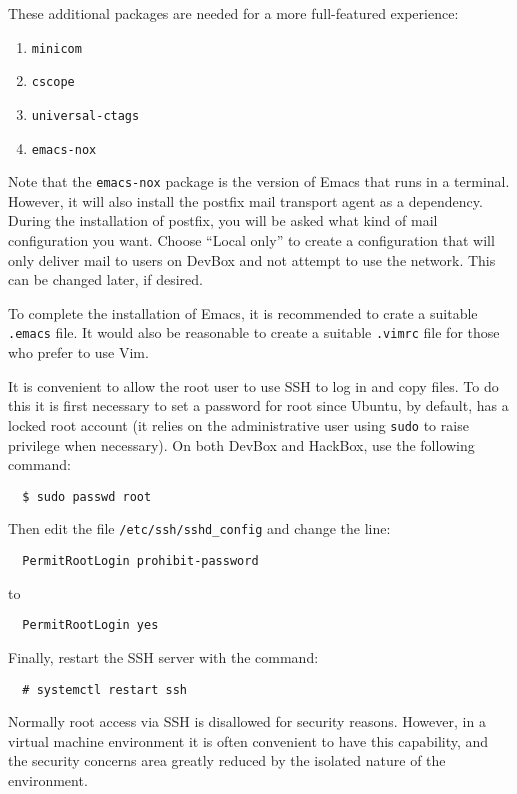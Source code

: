 \documentclass{article}
\newcommand{\command}[1]{\texttt{#1}}
\newcommand{\filename}[1]{\texttt{#1}}
\begin{document}
These additional packages are needed for a more full-featured experience:
\begin{enumerate}
  \item \texttt{minicom}
  \item \texttt{cscope}
  \item \texttt{universal-ctags}
  \item \texttt{emacs-nox}
\end{enumerate}

Note that the \texttt{emacs-nox} package is the version of Emacs that runs in a terminal.
However, it will also install the postfix mail transport agent as a dependency. During the
installation of postfix, you will be asked what kind of mail configuration you want. Choose
``Local only'' to create a configuration that will only deliver mail to users on DevBox and not
attempt to use the network. This can be changed later, if desired.

To complete the installation of Emacs, it is recommended to crate a suitable \filename{.emacs}
file. It would also be reasonable to create a suitable \filename{.vimrc} file for those who
prefer to use Vim.

It is convenient to allow the root user to use SSH to log in and copy files. To do this it is
first necessary to set a password for root since Ubuntu, by default, has a locked root account
(it relies on the administrative user using \command{sudo} to raise privilege when necessary).
On both DevBox and HackBox, use the following command:
\begin{Verbatim}
  $ sudo passwd root
\end{Verbatim}

Then edit the file \filename{/etc/ssh/sshd\_config} and change the line:
\begin{Verbatim}
  PermitRootLogin prohibit-password
\end{Verbatim}
to
\begin{Verbatim}
  PermitRootLogin yes
\end{Verbatim}

Finally, restart the SSH server with the command:
\begin{Verbatim}
  # systemctl restart ssh
\end{Verbatim}

Normally root access via SSH is disallowed for security reasons. However, in a virtual machine
environment it is often convenient to have this capability, and the security concerns area
greatly reduced by the isolated nature of the environment.
\end{document}
